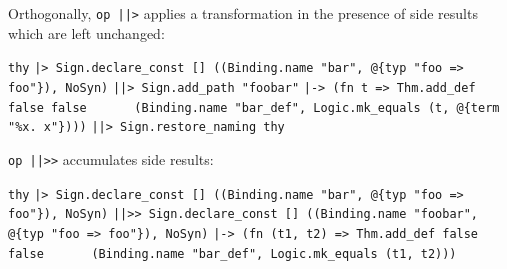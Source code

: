 \begin{isabellebody}
\begin{isamarkuptext}
\begin{mldecls}
  \end{mldecls}

  \noindent Orthogonally, \verb|op |\verb,|,\verb||\verb,|,\verb|>| applies a transformation
  in the presence of side results which are left unchanged:

  \smallskip\begin{mldecls}
\verb|thy|\isasep\isanewline%
\verb||\verb,|,\verb|> Sign.declare_const [] ((Binding.name "bar", @{typ "foo => foo"}), NoSyn)|\isasep\isanewline%
\verb||\verb,|,\verb||\verb,|,\verb|> Sign.add_path "foobar"|\isasep\isanewline%
\verb||\verb,|,\verb|-> (fn t => Thm.add_def false false|\isasep\isanewline%
\verb|      (Binding.name "bar_def", Logic.mk_equals (t, @{term "%x. x"})))|\isasep\isanewline%
\verb||\verb,|,\verb||\verb,|,\verb|> Sign.restore_naming thy|\isasep\isanewline%

  \end{mldecls}

  \noindent \verb|op |\verb,|,\verb||\verb,|,\verb|>>| accumulates side results:

  \smallskip\begin{mldecls}
\verb|thy|\isasep\isanewline%
\verb||\verb,|,\verb|> Sign.declare_const [] ((Binding.name "bar", @{typ "foo => foo"}), NoSyn)|\isasep\isanewline%
\verb||\verb,|,\verb||\verb,|,\verb|>> Sign.declare_const [] ((Binding.name "foobar", @{typ "foo => foo"}), NoSyn)|\isasep\isanewline%
\verb||\verb,|,\verb|-> (fn (t1, t2) => Thm.add_def false false|\isasep\isanewline%
\verb|      (Binding.name "bar_def", Logic.mk_equals (t1, t2)))|\isasep\isanewline%


\end{mldecls}
\end{isamarkuptext}
\end{isabellebody}
